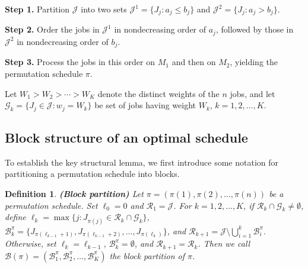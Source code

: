 ﻿\documentclass[12pt]{article} \textheight=24.5cm \textwidth=16.5cm \parskip = 0.165cm
\newtheorem{definition}{Definition}[section]
\begin{document}
\begin{sloppypar}
        \begin{algorithm}[H]
            \small
            \SetAlgoLined
            \DontPrintSemicolon
            \caption{Johnson's rule for $F2\mid\mid C_{\max}$}\label{alg:Johnson}
            \BlankLine
            \textbf{Step 1.} Partition $\mathcal{J}$ into two sets $\mathcal{J}^1=\{J_j: a_j \leq b_j\}$
            and $\mathcal{J}^2=\{J_j: a_j>b_j\}$.

            \textbf{Step 2.} Order the jobs in $\mathcal{J}^1$ in nondecreasing order of $a_j$, followed by those in $\mathcal{J}^2$ in nondecreasing order of $b_j$. \;

            \textbf{Step 3.} Process the jobs in this order on $M_1$ and then on $M_2$, yielding the permutation schedule $\pi$. \;

        \end{algorithm}

        Let $W_1 > W_2 > \cdots > W_K$ denote the distinct weights of the $n$ jobs, and let $\mathcal{G}_k = \{J_j \in \mathcal{J}: w_j = W_k\}$ be set of jobs having weight $W_k$, $k=1, 2,\ldots, K$.

        \subsection{Block structure of an optimal schedule} \label{sec:block}

        To establish the key structural lemma, we first introduce some notation for partitioning a permutation schedule into blocks.
        \begin{definition} \label{def:block}
        \textbf{(Block partition)} Let $\pi = (\pi(1), \pi(2), \ldots, \pi(n))$ be a permutation schedule.
        Set $\ell_0 = 0$ and $\mathcal{R}_1=\mathcal{J}$.
        For $k = 1, 2, \ldots, K$, if $\mathcal{R}_k \cap \mathcal{G}_k \neq \emptyset$, define $\ell_k=\max \{j: J_{\pi(j)} \in \mathcal{R}_k \cap \mathcal{G}_k\}$, $\mathcal{B}_k^{\pi} = \{J_{\pi(\ell_{k-1}+1)}, J_{\pi(\ell_{k-1}+2)}, \ldots, J_{\pi(\ell_k)}\}$, and $\mathcal{R}_{k+1}=\mathcal{J}\setminus\bigcup_{i=1}^{k}\mathcal{B}_i^{\pi}$.
        Otherwise, set $\ell_k=\ell_{k-1}$,  $\mathcal{B}_k^{\pi} =\emptyset$, and $\mathcal{R}_{k+1}=\mathcal{R}_{k}$.
        Then we call $\mathcal{B}(\pi)=(\mathcal{B}_1^{\pi}, \mathcal{B}_2^{\pi}, \ldots, \mathcal{B}_K^{\pi})$ the block partition of $\pi$.
        \end{definition}


\end{sloppypar}
\end{document}
